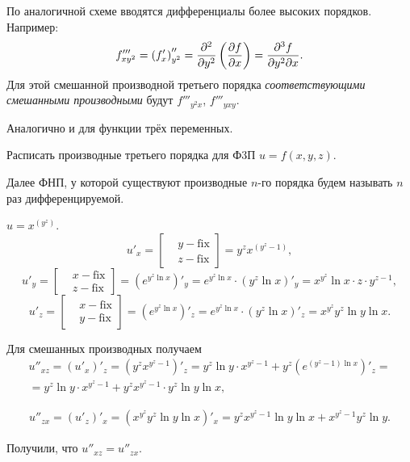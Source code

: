 \documentclass[../../main.tex]{subfiles}
\begin{document}
	По аналогичной схеме вводятся дифференциалы более высоких порядков. 
	Например:
	\[f'''_{xy^2} = \left(f'_x\right)''_{y^2} =
	 \frac{\partial ^2}{\partial y^2}\left(\frac{\partial f}{\partial x}\right) = 
	 \frac{\partial ^3f}{\partial y^2\partial x}.\]
	Для этой смешанной производной третьего порядка 
	\emph{соответствующими смешанными производными} будут $f'''_{y^2x}$, 
	$f'''_{yxy}$.
	
	Аналогично и для функции трёх переменных.
	
	\begin{exc}
		Расписать производные третьего порядка для Ф3П $u=f(x,y,z)$.
	\end{exc}

	Далее ФНП, у которой существуют производные $n$-го порядка будем 
	называть $n$ раз дифференцируемой.
	
	\begin{exmp}
		$u = x^{\left(y^z\right)}$.
		\[u'_x = \left[\begin{aligned}
			& y - \text{fix}\\
			& z - \text{fix}
		\end{aligned}\right] = y^zx^{\left(y^z - 1\right)},\]
		\[u'_y = \left[\begin{aligned}
			& x - \text{fix}\\
			& z - \text{fix}
		\end{aligned}\right] = \left(e^{y^z\ln x}\right)'_y = 
		e^{y^z\ln x}\cdot\left(y^z\ln x\right)'_y = x^{y^z}\ln x\cdot 
		z\cdot y^{z-1},\]
		\[u'_z = \left[\begin{aligned}
			& x - \text{fix}\\
			& y - \text{fix} 
		\end{aligned}\right] = \left(e^{y^z\ln x}\right)'_z = 
		e^{y^z\ln x}\cdot\left(y^z\ln x\right)'_z = x^{y^z}y^z\ln y\ln x.\]
		
		Для смешанных производных получаем
		\begin{gather*}
			u''_{xz} = \left(u'_x\right)'_z = 
			\left(y^zx^{y^z - 1}\right)'_z = 
			y^z\ln y\cdot x^{y^z - 1} + 
			y^{z}\left(e^{(y^z - 1)\ln x}\right)'_z =\\
			= y^z\ln y\cdot x^{y^z - 1} + y^zx^{y^z - 1}\cdot y^z\ln y\ln x,
		\end{gather*}
		
		\begin{gather*}
			u''_{zx} = \left(u'_z\right)'_x =
			 \left(x^{y^z}y^z\ln y\ln x\right)'_x
			 = y^zx^{y^z - 1}\ln y\ln x + x^{y^z - 1}y^z\ln y.
		\end{gather*}
		
		Получили, что $u''_{xz}=u''_{zx}$.
	\end{exmp}
\end{document}
